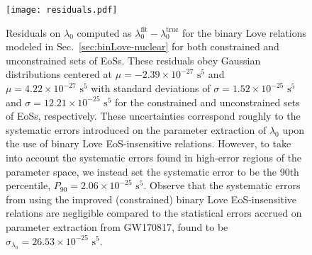 \documentclass[prd,twocolumn,nofootinbib,superscriptaddress,amsmath,amssymb]{revtex4-1}
\begin{document}
\begin{figure}
\begin{center} 
\texttt{[image: residuals.pdf]}
\end{center}
\caption{
Residuals on $\lambda_0$ computed as $\lambda_0^{\text{fit}}-\lambda_0^{\text{true}}$ for the binary Love relations modeled in Sec.~\ref{sec:binLove-nuclear} for both constrained and unconstrained sets of EoSs.
These residuals obey Gaussian distributions centered at $\mu=-2.39 \times 10^{-27} \text{ s}^5$ and $\mu=4.22 \times 10^{-27} \text{ s}^5$ with standard deviations of $\sigma=1.52\times10^{-25} \text{ s}^5$ and $\sigma=12.21\times10^{-25} \text{ s}^5$ for the constrained and unconstrained sets of EoSs, respectively.
These uncertainties correspond roughly to the systematic errors introduced on the parameter extraction of $\lambda_0$ upon the use of binary Love EoS-insensitive relations.
However, to take into account the systematic errors found in high-error regions of the parameter space, we instead set the systematic error to be the 90th percentile, $P_{90}=2.06\times10^{-25} \text{ s}^5$.
Observe that the systematic errors from using the improved (constrained) binary Love EoS-insensitive relations are negligible compared to the statistical errors accrued on parameter extraction from GW170817, found to be $\sigma_{\lambda_0}=26.53 \times 10^{-25} \text{ s}^5$.
}
\label{fig:residuals}
\end{figure}

\end{document}
